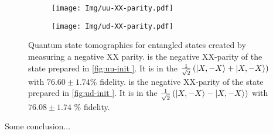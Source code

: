 \begin{figure}[htbp]
    \begin{subfigure}[t]{0.49\textwidth}\centering
        \caption{}
        \texttt{[image: Img/uu-XX-parity.pdf]}
        \label{fig:uu-XX}
    \end{subfigure}
    \begin{subfigure}[t]{0.49\textwidth}\centering
        \caption{}
        \texttt{[image: Img/ud-XX-parity.pdf]}
        \label{fig:ud-XX}
    \end{subfigure}
    \caption{ Quantum state tomographies for entangled states created by measuring a negative XX parity.
     is the negative XX-parity of the state prepared in \cref{fig:uu-init }. It is in the $    \tfrac{1}{\sqrt{2}} \left( {\left\vert{X,-X}\right\rangle} +{\left\vert{X,-X}\right\rangle} \right)
$ with  $76.60 \pm 1.74\%$ fidelity.
     is the negative XX-parity of the state prepared in \cref{fig:ud-init }. It is in the $\tfrac{1}{\sqrt{2}} \left( {\left\vert{X,-X}\right\rangle} -{\left\vert{X,-X}\right\rangle} \right)$  with  $76.08 \pm 1.74$ \% fidelity.
    }
    \label{fig:2qubit_parity_Tomos}
\end{figure}

Some conclusion...

